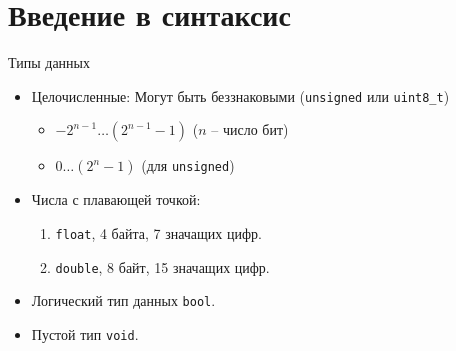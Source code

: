 \documentclass[
    9pt,
    hyperref={pdfencoding=unicode}
    ]{beamer}
\begin{document}
\section{Введение в синтаксис}
\begin{frame}{Типы данных}
    \begin{itemize}
        \item<1-> Целочисленные:
        Могут быть беззнаковыми (\texttt{unsigned} или \texttt{uint8_t})
        \begin{itemize}
            \item $ -2^{n-1} \ldots (2^{n-1}-1) $ ($n$ -- число бит)
            \item $ 0 \ldots (2^{n}-1) $ (для \texttt{unsigned})
        \end{itemize}
        \item Числа с плавающей точкой:
        \begin{enumerate}
            \item \texttt{float}, 4 байта, 7 значащих цифр.
            \item \texttt{double}, 8 байт, 15 значащих цифр.
        \end{enumerate}
        \item Логический тип данных \texttt{bool}.
        \item Пустой тип \texttt{void}.        
    \end{itemize}
\end{frame}
\end{document}
